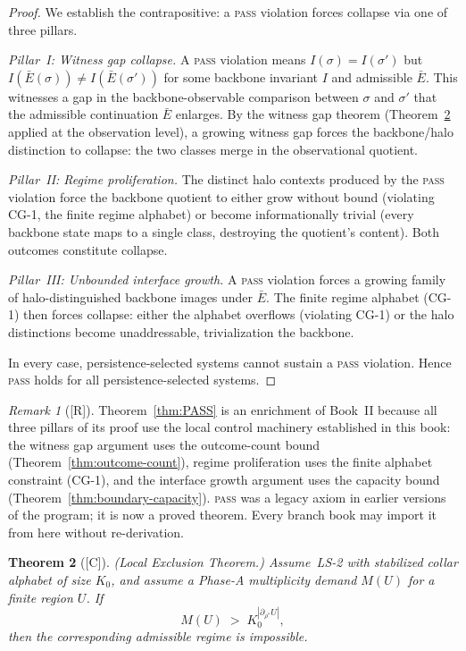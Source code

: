 \documentclass[12pt,oneside]{amsbook}
\theoremstyle{plain}
\newtheorem{theorem}{Theorem}[section]
\theoremstyle{definition}
\theoremstyle{remark}
\newtheorem{remark}[theorem]{Remark}
\newcommand{\status}[1]{\textup{[#1]}}
\begin{document}
\begin{proof}
We establish the contrapositive: a \textsc{pass} violation forces
collapse via one of three pillars.

\emph{Pillar~I: Witness gap collapse.}  A \textsc{pass} violation
means $I(\sigma) = I(\sigma')$ but $I(\bar{E}(\sigma)) \neq
I(\bar{E}(\sigma'))$ for some backbone invariant $I$ and admissible
$\bar{E}$.  This witnesses a gap in the backbone-observable
comparison between $\sigma$ and $\sigma'$ that the admissible
continuation $\bar{E}$ enlarges.  By the witness gap theorem
(Theorem~\ref{thm:packing-contradiction} applied at the observation
level), a growing witness gap forces the backbone/halo distinction to
collapse: the two classes merge in the observational quotient.

\emph{Pillar~II: Regime proliferation.}  The distinct halo contexts
produced by the \textsc{pass} violation force the backbone quotient
to either grow without bound (violating CG-1, the finite regime
alphabet) or become informationally trivial (every backbone state
maps to a single class, destroying the quotient's content).  Both
outcomes constitute collapse.

\emph{Pillar~III: Unbounded interface growth.}  A \textsc{pass}
violation forces a growing family of halo-distinguished backbone
images under $\bar{E}$.  The finite regime alphabet (CG-1) then
forces collapse: either the alphabet overflows (violating CG-1) or
the halo distinctions become unaddressable, trivialization the
backbone.

In every case, persistence-selected systems cannot sustain a
\textsc{pass} violation.  Hence \textsc{pass} holds for all
persistence-selected systems.
\end{proof}

\begin{remark}[\status{R}]
Theorem~\ref{thm:PASS} is an enrichment of Book~II because all three
pillars of its proof use the local control machinery established in
this book: the witness gap argument uses the outcome-count bound
(Theorem~\ref{thm:outcome-count}), regime proliferation uses the
finite alphabet constraint (CG-1), and the interface growth argument
uses the capacity bound (Theorem~\ref{thm:boundary-capacity}).
\textsc{pass} was a legacy axiom in earlier versions of the program;
it is now a proved theorem.  Every branch book may import it from
here without re-derivation.
\end{remark}

\begin{theorem}[\status{C}]\label{thm:packing-contradiction}
\textup{(Local Exclusion Theorem.)}  Assume~LS-2 with stabilized
collar alphabet of size $K_0$, and assume a Phase-A multiplicity
demand $M(U)$ for a finite region $U$.  If
\[
  M(U) \;>\; K_0^{|\partial_{\rho^*} U|},
\]
then the corresponding admissible regime is impossible.
\end{theorem}
\end{document}
